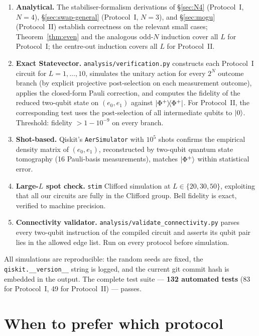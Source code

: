 \documentclass[11pt,a4paper]{article}
\theoremstyle{definition}
\newcommand{\Phip}{\ket{\Phi^+}}
\begin{document}
\begin{enumerate}
\item \textbf{Analytical.} The stabiliser-formalism derivations of
  \S\ref{sec:N4} (Protocol~I, $N=4$), \S\ref{sec:swap-general}
  (Protocol~I, $N=3$), and \S\ref{sec:mogu} (Protocol~II) establish
  correctness on the relevant small cases; Theorem~\ref{thm:even} and
  the analogous odd-$N$ induction cover all $L$ for Protocol~I; the
  centre-out induction covers all $L$ for Protocol~II.
\item \textbf{Exact Statevector.}
  \texttt{analysis/verification.py} constructs each Protocol~I circuit
  for $L=1,\dots,10$, simulates the unitary action for every $2^N$
  outcome branch (by explicit projective post-selection on each
  measurement outcome), applies the closed-form Pauli correction, and
  computes the fidelity of the reduced two-qubit state on $(e_0,e_1)$
  against $\ketbra{\Phi^+}{\Phi^+}$. For Protocol~II, the corresponding
  test uses the post-selection of all intermediate qubits to $\ket 0$.
  Threshold: fidelity $>1-10^{-9}$ on every branch.
\item \textbf{Shot-based.} Qiskit's \texttt{AerSimulator} with $10^5$
  shots confirms the empirical density matrix of $(e_0,e_1)$,
  reconstructed by two-qubit quantum state tomography
  (16 Pauli-basis measurements), matches $\Phip$ within statistical
  error.
\item \textbf{Large-$L$ spot check.} \texttt{stim} Clifford simulation
  at $L\in\{20,30,50\}$, exploiting that all our circuits are fully in
  the Clifford group. Bell fidelity is exact, verified to machine
  precision.
\item \textbf{Connectivity validator.}
  \texttt{analysis/validate\_connectivity.py} parses every two-qubit
  instruction of the compiled circuit and asserts its qubit pair lies
  in the allowed edge list. Run on every protocol before simulation.
\end{enumerate}

All simulations are reproducible: the random seeds are fixed, the
\texttt{qiskit.\_\_version\_\_} string is logged, and the current git
commit hash is embedded in the output. The complete test suite —
\textbf{132 automated tests} (83 for Protocol~I, 49 for Protocol~II) —
passes.

\section{When to prefer which protocol}
\label{sec:tradeoffs}
\end{document}

